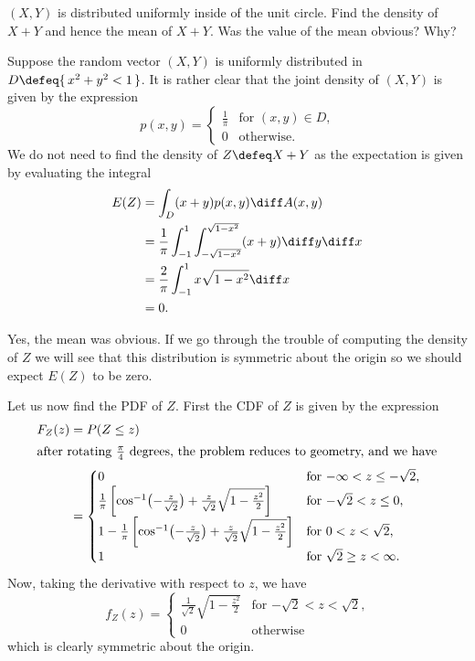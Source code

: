 \begin{problem}[Handout 18, \# 15]
  \((X,Y)\) is distributed uniformly inside of the unit circle. Find the
  density of \(X+Y\) and hence the mean of \(X+Y\). Was the value of the
  mean obvious? Why?
\end{problem}
\begin{solution}
  Suppose the random vector \((X,Y)\) is uniformly distributed in
  \(D\defeq \{\,x^2+y^2<1\,\}\). It is rather clear that the joint density
  of \((X,Y)\) is given by the expression
  \[
    p(x,y)=
    \begin{cases}
      \frac{1}{\pi}&\text{for \((x,y)\in D\),}\\
      0&\text{otherwise.}
    \end{cases}
  \]
  We do not need to find the density of \(Z\defeq X+Y\) as the expectation
  is given by evaluating the integral
  \begin{align*}
    E(Z)
    &=\int_D (x+y)p(x,y)\diff A(x,y)\\
    &=\frac{1}{\pi}\int_{-1}^1\int_{-\sqrt{1-x^2}}^{\sqrt{1-x^2}} (x+y)\diff
      y\diff x\\
    &=\frac{2}{\pi}\int_{-1}^1x\sqrt{1-x^2}\diff x\\
    &=0.
  \end{align*}

  Yes, the mean was obvious. If we go through the trouble of computing the
  density of \(Z\) we will see that this distribution is symmetric about
  the origin so we should expect \(E(Z)\) to be zero.

  Let us now find the PDF of \(Z\). First the CDF of \(Z\) is given by the
  expression
  \begin{align*}
    F_Z(z)
    &=P(Z\leq z)\\
    \intertext{after rotating \(\frac{\pi}{4}\) degrees, the problem
    reduces to geometry, and we have}
    &=
      \begin{cases}
        0&\text{for \(-\infty<z\leq-\sqrt{2}\),}\\
        \frac{1}{\pi}\left[\cos^{-1}\bigl(-\frac{z}{\sqrt{2}}\bigr)+\frac{z}{\sqrt{2}}\sqrt{1-\frac{z^2}{2}}\right]
        &\text{for \(-\sqrt{2}<z\leq 0\),}\\
        1-\frac{1}{\pi}\left[\cos^{-1}\bigl(-\frac{z}{\sqrt{2}}\bigr)+\frac{z}{\sqrt{2}}\sqrt{1-\frac{z^2}{2}}\right]
        &\text{for \(0<z<\sqrt{2}\),}\\
        1&\text{for \(\sqrt{2}\geq z<\infty\).}
      \end{cases}
  \end{align*}
  Now, taking the derivative with respect to \(z\), we have
  \[
    f_Z(z)=
    \begin{cases}
      \frac{1}{\sqrt{2}}\sqrt{1-\frac{z^2}{2}}&\text{for
        \(-\sqrt{2}<z<\sqrt{2}\),}\\
      0&\text{otherwise}
    \end{cases}
  \]
  which is clearly symmetric about the origin.
\end{solution}
\newpage

